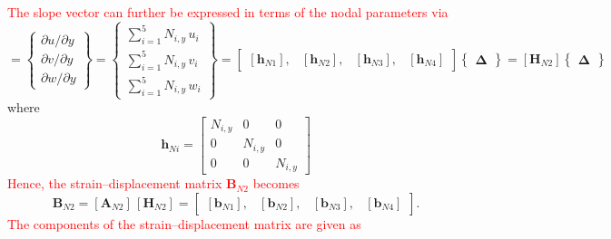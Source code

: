 \textcolor{red}{The slope vector can further be expressed in terms of the nodal parameters via}
\begin{equation}
[\boldsymbol{\theta}_{N2}] =  \begin{Bmatrix}
\partial u / \partial y\\
\partial v / \partial y \\
\partial w / \partial y
\end{Bmatrix}
= \begin{Bmatrix}
\sum\nolimits_{i=1}^5 N_{i,y} \, u_i\\
\sum\nolimits_{i=1}^5 N_{i,y} \, v_i \\
\sum\nolimits_{i=1}^5 N_{i,y} \, w_i
\end{Bmatrix} 
= \begin{bmatrix}
[\mathbf{h}_{N1}], & [\mathbf{h}_{N2}], & [\mathbf{h}_{N3}], & [\mathbf{h}_{N4}] 
\end{bmatrix}  \begin{Bmatrix} \boldsymbol{\Delta} \end{Bmatrix}  
= [\mathbf{H}_{N2}] \begin{Bmatrix} \boldsymbol{\Delta} \end{Bmatrix} 
\end{equation}
where 
\begin{equation}
\mathbf{h}_{Ni} = \begin{bmatrix}
N_{i,y} &  0 & 0  \\
0 & N_{i,y} & 0  \\
0 & 0 & N_{i,y} \end{bmatrix} 
\end{equation}
\textcolor{red}{Hence, the strain--displacement matrix $\mathbf{B}_{N2}$ becomes}
\begin{equation}
\mathbf{B}_{N2} = [\mathbf{A}_{N2}] \, [\mathbf{H}_{N2}] = \begin{bmatrix}
[\mathbf{b}_{N1}], & [\mathbf{b}_{N2}], & [\mathbf{b}_{N3}], & [\mathbf{b}_{N4}]
\end{bmatrix}. 
\end{equation}
\textcolor{red}{The components of the strain--displacement matrix are given as}
